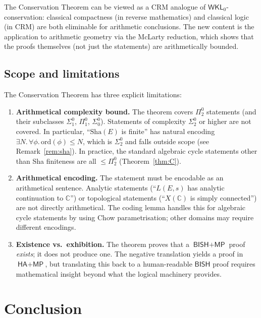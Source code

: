 \documentclass[11pt,a4paper]{article}
\theoremstyle{plain}
\theoremstyle{definition}
\newcommand{\BISH}{\textsf{BISH}}
\newcommand{\WKL}{\textsf{WKL}}
\newcommand{\MP}{\textsf{MP}}
\newcommand{\HA}{\textsf{HA}}
\newcommand{\C}{\mathbb{C}}
\begin{document}
The Conservation Theorem can be viewed as a CRM analogue of $\WKL_0$-conservation: classical compactness (in reverse mathematics) and classical logic (in CRM) are both eliminable for arithmetic conclusions.  The new content is the application to arithmetic geometry via the McLarty reduction, which shows that the proofs themselves (not just the statements) are arithmetically bounded.

\subsection{Scope and limitations}

The Conservation Theorem has three explicit limitations:

\begin{enumerate}[label=(\roman*)]
\item \textbf{Arithmetical complexity bound.}  The theorem covers $\Pi^0_2$ statements (and their subclasses $\Sigma^0_1$, $\Pi^0_1$, $\Sigma^0_0$).  Statements of complexity $\Sigma^0_2$ or higher are not covered.  In particular, ``$\mathrm{Sha}(E)$ is finite'' has natural encoding $\exists N.\, \forall \phi.\, \mathrm{ord}(\phi) \le N$, which is $\Sigma^0_2$ and falls outside scope (see Remark~\ref{rem:sha}).  In practice, the standard algebraic cycle statements other than Sha finiteness are all $\le \Pi^0_2$ (Theorem~\ref{thm:C}).

\item \textbf{Arithmetical encoding.}  The statement must be encodable as an arithmetical sentence.  Analytic statements (``$L(E,s)$ has analytic continuation to $\C$'') or topological statements (``$X(\C)$ is simply connected'') are not directly arithmetical.  The coding lemma handles this for algebraic cycle statements by using Chow parametrisation; other domains may require different encodings.

\item \textbf{Existence vs.\ exhibition.}  The theorem proves that a $\BISH + \MP$ proof \emph{exists}; it does not produce one.  The negative translation yields a proof in $\HA + \MP$, but translating this back to a human-readable $\BISH$ proof requires mathematical insight beyond what the logical machinery provides.
\end{enumerate}


\section{Conclusion}\label{sec:conclusion}
\end{document}

